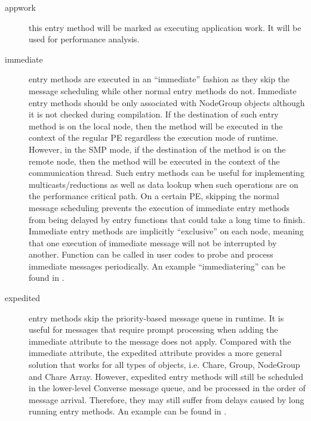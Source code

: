 \begin{description}
\item[appwork] this entry method will be marked as executing application work. It will be used for performance analysis.

\item[immediate] entry methods are executed in an
``immediate'' fashion as they skip the message scheduling while other normal
entry methods do not. Immediate entry methods should be only associated with
NodeGroup objects although it is not checked during compilation. If the
destination of such entry method is on the local node, then the method will be
executed in the context of the regular PE regardless the execution mode of
\charmpp{} runtime. However, in the SMP mode, if the destination of the method
is on the remote node, then the method will be executed in the context of the
communication thread.  
Such entry methods can be useful for implementing multicasts/reductions as well
as data lookup when such operations are on the performance critical path. On a
certain \charmpp{} PE, skipping the normal message scheduling prevents the
execution of immediate entry methods from being delayed by entry functions that
could take a long time to finish. Immediate entry methods are implicitly
``exclusive'' on each node, meaning that one execution of immediate message
will not be interrupted by another. Function  can be
called in user codes to probe and process immediate messages periodically. An
example ``immediatering'' can be found in .

\item[expedited] entry methods skip the priority-based message
queue in \charmpp{} runtime. It is useful for messages that require prompt
processing when adding the immediate attribute to the message does not apply.
Compared with the immediate attribute, the expedited attribute provides a more
general solution that works for all types of \charmpp{} objects, i.e. Chare,
Group, NodeGroup and Chare Array. However, expedited entry methods will still
be scheduled in the lower-level Converse message queue, and be processed in the
order of message arrival. Therefore, they may still suffer from delays caused
by long running entry methods. An example can be found in 
.


\end{description}

